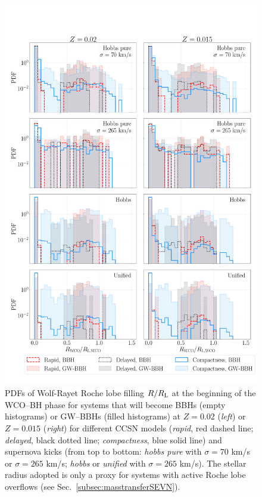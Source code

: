 \documentclass[a4paper,titlepage]{book}     	%
\begin{document}
\begin{figure}[h!]
	\centering
	\includegraphics[width=\textwidth]{./images/WRBH-RLfillpureHe.pdf}	
	\caption{PDFs of Wolf-Rayet Roche lobe filling $R/R_{\rm L}$ at the beginning of the WCO--BH phase for systems that will become BBHs (empty histograms) or GW--BBHs (filled histograms) at $Z=0.02$ (\emph{left}) or $Z=0.015$ (\emph{right}) for different CCSN models (\emph{rapid}, red dashed line; \emph{delayed}, black dotted line; \emph{compactness}, blue solid line) and supernova kicks (from top to bottom: \emph{hobbs pure} with $\sigma = 70$ km/s or $\sigma = 265$ km/s; \emph{hobbs} or \emph{unified} with $\sigma = 265$ km/s). The stellar radius adopted is only a proxy for systems with active Roche lobe overflows (see Sec.\ \ref{subsec:masstransferSEVN}).}\label{fig:resultsWRBH-RLfillpureHe}
\end{figure}
\end{document}
